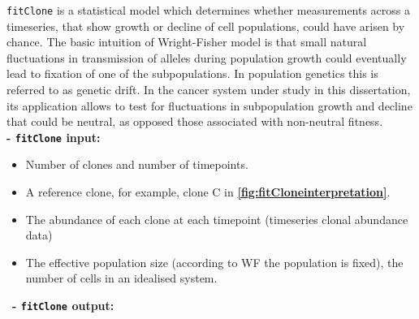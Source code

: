  \texttt{fitClone} is a statistical model which determines whether measurements across a timeseries, that show growth or decline of cell populations, could have arisen by chance.  The basic intuition of Wright-Fisher model is that small natural fluctuations in transmission of alleles during population growth could eventually lead to fixation of one of the subpopulations. 
 In population genetics this is referred to as genetic drift. In the cancer system under study in this dissertation, its application allows to test for fluctuations in subpopulation growth and decline that could be neutral, as opposed those associated with non-neutral fitness. 
\\
\textbf{- \texttt{fitClone} \textbf{input:} } 
 	\begin{itemize}
 	    \item 	Number of clones and number of timepoints.
    \item 	A reference clone, for example, clone C in \textbf{\autoref{fig:fitCloneinterpretation}}.
 	   \item The abundance of each clone at each timepoint (timeseries clonal abundance data)
 	   \item The effective population size (according to WF the population is fixed), the number of cells in an idealised system.
	\end{itemize}
\
\textbf{- \texttt{fitClone} \textbf{output:} } 
